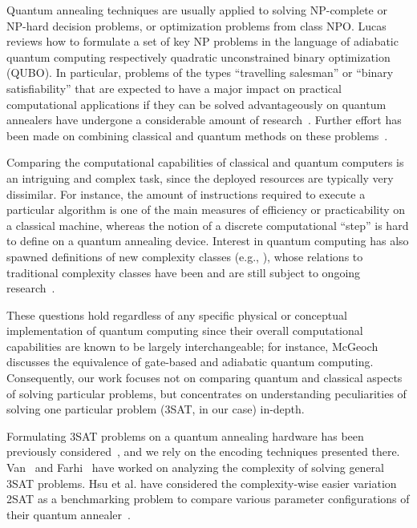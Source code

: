 Quantum annealing techniques are usually applied to solving NP-complete or NP-hard decision problems, or optimization problems from class NPO. Lucas~\cite{lucas2014ising} reviews how to formulate a set of key NP problems in the language of adiabatic quantum computing respectively quadratic unconstrained binary optimization (QUBO). In particular, problems of the types ``travelling salesman'' or ``binary satisfiability'' that are expected to have a major impact on practical computational applications if they can be solved advantageously on quantum annealers have undergone a considerable amount of research~\cite{heim2017designing,warren2017small,moylett2017quantum,strand2017zzz,benjamin2017measurement,neukart2017traffic}. Further effort has been made on combining classical and quantum methods on these problems~\cite{feld2018hybrid}.

Comparing the computational capabilities of classical and quantum computers is an intriguing and complex task, since the deployed resources are typically very dissimilar. For instance, the amount of instructions required to execute a particular algorithm is one of the main measures of efficiency or practicability on a classical machine, whereas the notion of a discrete computational ``step'' is hard to define on a quantum annealing device. Interest in quantum computing has also spawned definitions of new complexity classes (e.g., \cite{klauck2017complexity,morimae2017merlinization}), whose relations to traditional complexity classes have been and are still subject to ongoing research~\cite{bernstein1997quantum,marriott2005quantum}.


These questions hold regardless of any specific physical or conceptual implementation of quantum computing since their overall computational capabilities are known to be largely interchangeable; for instance, McGeoch~\cite{mcgeoch2014adiabatic} discusses the
equivalence of gate-based and adiabatic quantum computing. Consequently,
our work focuses not on comparing quantum and classical aspects of solving particular problems, but concentrates on understanding peculiarities
of solving one particular problem (3SAT, in our case) in-depth.

Formulating 3SAT problems on a quantum annealing hardware has been previously considered~\cite{choi2011different,choi2010adiabatic,farhi2000quantum}, and we rely on the encoding techniques presented there. Van~\cite{van2001powerful} and Farhi~\cite{farhi2009quantum} have worked on analyzing the complexity of solving general 3SAT problems. Hsu et al. have considered the complexity-wise easier variation 2SAT as a benchmarking problem to compare various parameter configurations of their quantum annealer~\cite{hsu2018quantum}.
 
